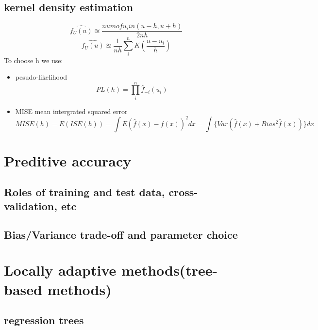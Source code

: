 \documentclass[10pt]{article}
\theoremstyle{break}
\begin{document}
        \subsection{kernel density estimation}
            $$\hat{f_U(u)}\approxeq \frac{num of u_i in (u-h, u+h)}{2nh} $$
            $$\hat{f_U(u)}\approxeq \frac{1}{nh}\sum_i^nK(\frac{u-u_i}{h}) $$
            To choose h we use:
            \begin{itemize}
                \item pesudo-likelihood $$PL(h)=\prod_i^n\hat{f}_{-i}(u_i)$$
                \item MISE mean intergrated squared error 
                $$MISE(h)=E(ISE(h))=\int E(\hat{f}(x)-f(x))^2dx =\int\{Var(\hat{f}(x)+Bias^2\hat{f}(x))\}dx$$
            \end{itemize}
\section{Preditive accuracy}
    \subsection{Roles of training and test data, cross-validation, etc}
    \subsection{Bias/Variance trade-off and parameter choice}
\section{Locally adaptive methods(tree-based methods)}
    \subsection{regression trees}
\end{document}
